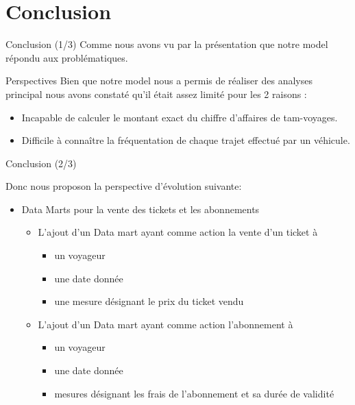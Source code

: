 \documentclass[usenames,dvipsnames]{beamer}
\begin{document}
\section{Conclusion}
\begin{frame}{Conclusion (1/3)}
Comme nous avons vu par la présentation que notre model répondu aux problématiques. 
\begin{block}{Perspectives}
Bien que notre model nous a permis de réaliser des analyses principal nous avons constaté qu’il était assez limité pour les 2 raisons :
\begin{itemize}
    \item Incapable de calculer le montant exact du chiffre d’affaires de tam-voyages. 
    \item Difficile à connaître la fréquentation de chaque trajet effectué par un véhicule.
\end{itemize}
\end{block}
\newpage

\end{frame}
\begin{frame}{Conclusion (2/3)}
\begin{block}{Donc nous proposon la perspective d'évolution suivante: }
\begin{itemize}
    \item Data Marts  pour la vente des tickets et les abonnements
    \begin{itemize}
    \item 	L’ajout d’un Data mart ayant comme action la vente d’un ticket à 
            \begin{itemize}
                \item un voyageur
                \item une date donnée
                \item une mesure désignant le prix du ticket vendu
            \end{itemize}
    \item 	L’ajout d’un Data mart ayant comme action l’abonnement à 
             \begin{itemize}
            \item un voyageur
            \item une date donnée 
            \item mesures désignant les frais de l’abonnement et sa durée de validité
            \end{itemize}
\end{itemize}
\end{itemize}
\end{block}
\end{frame}
\end{document}
